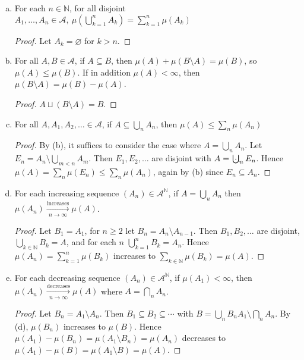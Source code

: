 \documentclass{article}
\newcommand{\N}{\mathbb{N}}
\newcommand{\bigcupdot}{\mathop{\mathchoice{\hspace{0.45em}}{\hspace{0.35em}}{}{}\cdot\mathchoice{\hspace{-0.85em}}{\hspace{-0.725em}}{}{}\bigcup\limits}}
\theoremstyle{definition}
\begin{document}
\begin{enumerate}[(a)]
    \item For each $n \in \N$, for all disjoint $A_1,\dots,A_n \in \mathscr{A},\  \mu \left( \bigcup_{k=1}^n A_k \right) = \sum_{k=1}^n \mu(A_k)$
    \begin{proof}
        Let $A_k = \varnothing$ for $k > n$.
    \end{proof}
    \item For all $A, B \in \mathscr{A}$, if $A \subseteq B$, then $\mu(A) + \mu(B \setminus A)= \mu(B)$, so $\mu(A) \leq \mu(B)$.
    If in addition $\mu(A) < \infty$, then $\mu(B \setminus A) = \mu(B) - \mu(A)$.
    \begin{proof}
        $A \sqcup (B \setminus A) = B$.
    \end{proof}
    \item For all $A, A_1, A_2, \dots \in \mathscr{A}$, if $A \subseteq \bigcup_n A_n$, then $\mu(A) \leq \sum_n \mu(A_n)$
    \begin{proof}
        By (b), it suffices to consider the case where $A = \bigcup_n A_n$. Let $E_n = A_n \setminus \bigcup_{m < n} A_m$. Then $E_1, E_2, \dots$ are disjoint with $A = \bigcupdot_n E_n$.
        Hence $\mu(A) = \sum_n \mu(E_n) \leq \sum_n \mu(A_n)$, again by (b) since $E_n \subseteq A_n$.
    \end{proof}
    \item For each increasing sequence $(A_n) \in \mathscr{A}^{\N}$, if $A = \bigcup_u A_n$ then $\mu(A_n) \xrightarrow[n \to \infty]{\text{increases}} \mu(A)$.
    \begin{proof}
        Let $B_1 = A_1$, for $n \geq 2$ let $B_n = A_n \setminus A_{n-1}$. Then $B_1, B_2, \dots$ are disjoint, $\bigcup_{k \in \N} B_k = A$, and for each $n$ $\bigcup_{k=1}^n B_k = A_n$.
        Hence $\mu(A_n) = \sum_{k=1}^n \mu(B_k)$ increases to $\sum_{k \in \N} \mu(B_k) = \mu(A)$.
    \end{proof}
    \item For each decreasing sequence $(A_n) \in \mathscr{A}^{\N}$, if $\mu(A_1) < \infty$, then $\mu(A_n) \xrightarrow[n \to \infty]{\text{decreases}} \mu(A)$ where $A = \bigcap_n A_n$.
    \begin{proof}
        Let $B_n = A_1 \setminus A_n$. Then $B_1 \subseteq B_2 \subseteq \cdots$ with $B = \bigcup_n B_n A_1 \setminus \bigcap_n A_n$. By (d), $\mu(B_n)$ increases to $\mu(B)$.
        Hence $\mu(A_1) - \mu(B_n) = \mu(A_1 \setminus B_n) = \mu(A_n)$ decreases to $\mu(A_1) - \mu(B) = \mu(A_1 \setminus B) = \mu(A)$.
    \end{proof}

\end{enumerate}
\end{document}
